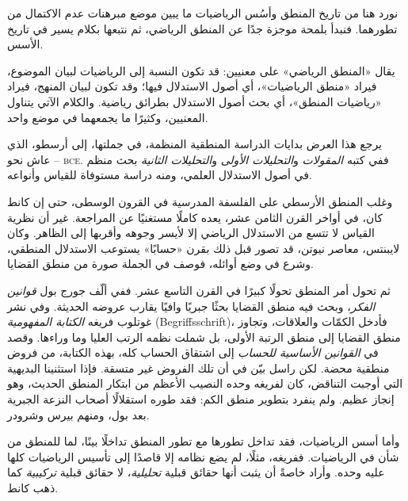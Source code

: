 \documentclass[../../../include/open-logic-section]{subfiles}
\begin{document}


نورد هنا من تاريخ المنطق وأسُس الرياضيات ما يبين موضع مبرهنات
عدم الاكتمال من تطورهما. فنبدأ بلمحة موجزة جدًا عن المنطق الرياضي،
ثم نتبعها بكلام يسير في تاريخ الأسس.

\begin{digress}
  يقال «المنطق الرياضي» على معنيين: قد تكون النسبة إلى الرياضيات
  لبيان الموضوع، فيراد «منطق الرياضيات»، أي أصول الاستدلال فيها؛
  وقد تكون لبيان المنهج، فيراد «رياضيات المنطق»، أي بحث أصول
  الاستدلال بطرائق رياضية. والكلام الآتي يتناول المعنيين، وكثيرًا
  ما يجمعهما في موضع واحد.
\end{digress}

يرجع هذا العرض بدايات الدراسة المنطقية المنظمة، في جملتها،
إلى أرسطو، الذي عاش نحو -- \textsc{bce}. ففي كتبه
\emph{المقولات} و\emph{التحليلات الأولى} و\emph{التحليلات الثانية}
بحث منظم في أصول الاستدلال العلمي، ومنه دراسة مستوفاة للقياس
وأنواعه.

وغلب المنطق الأرسطي على الفلسفة المدرسية في القرون الوسطى،
حتى إن كانط كان، في أواخر القرن الثامن عشر، يعده كاملًا مستغنيًا
عن المراجعة. غير أن نظرية القياس لا تتسع من الاستدلال الرياضي
إلا لأيسر وجوهه وأقربها إلى الظاهر. وكان لايبنتس، معاصر نيوتن،
قد تصور قبل ذلك بقرن «حسابًا» يستوعب الاستدلال المنطقي، وشرع في
وضع أوائله، فوصف في الجملة صورة من منطق القضايا.

ثم تحول أمر المنطق تحولًا كبيرًا في القرن التاسع عشر. ففي
 ألّف جورج بول \emph{قوانين الفكر}، وبحث فيه منطق القضايا
بحثًا جبريًا وافيًا يقارب عروضه الحديثة. وفي  نشر غوتلوب
فريغه \emph{الكتابة المفهومية} (Begriffsschrift)، فأدخل الكمّات
والعلاقات، وتجاوز منطق القضايا إلى منطق الرتبة الأولى، بل شملت
نظمه الرتب العليا وما وراءها. وقصد في \emph{القوانين الأساسية للحساب}
إلى اشتقاق الحساب كله، بهذه الكتابة، من فروض منطقية محضة.
لكن راسل بيّن في  أن تلك الفروض غير متسقة. فإذا استثنينا
البديهية التي أوجبت التناقض، كان لفريغه وحده النصيب الأعظم من
ابتكار المنطق الحديث، وهو إنجاز عظيم. ولم ينفرد بتطوير منطق الكم:
فقد طوره استقلالًا أصحاب النزعة الجبرية بعد بول، ومنهم بيرس وشرودر.

وأما أسس الرياضيات، فقد تداخل تطورها مع تطور المنطق تداخلًا
بينًا، لما للمنطق من شأن في الرياضيات. ففريغه، مثلًا، لم يضع
نظامه إلا قاصدًا إلى تأسيس الرياضيات كلها عليه وحده. وأراد خاصةً
أن يثبت أنها حقائق قبلية \emph{تحليلية}، لا حقائق قبلية
\emph{تركيبية} كما ذهب كانط.
\end{document}

